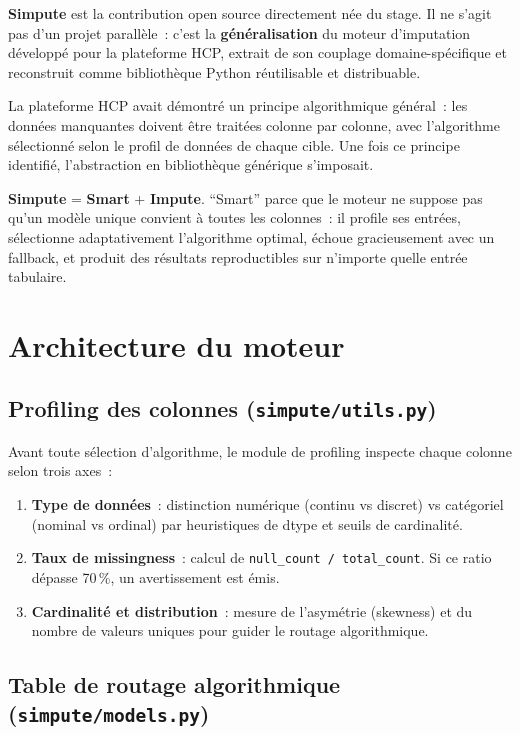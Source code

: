 \documentclass[12pt,a4paper]{report}
\begin{document}
\textbf{Simpute} est la contribution open source directement née du stage. Il ne s'agit pas d'un projet parallèle~: c'est la \textbf{généralisation} du moteur d'imputation développé pour la plateforme HCP, extrait de son couplage domaine-spécifique et reconstruit comme bibliothèque Python réutilisable et distribuable.

La plateforme HCP avait démontré un principe algorithmique général~: les données manquantes doivent être traitées colonne par colonne, avec l'algorithme sélectionné selon le profil de données de chaque cible. Une fois ce principe identifié, l'abstraction en bibliothèque générique s'imposait.

\begin{infobox}[Étymologie]
\textbf{Simpute} = \textbf{Smart} + \textbf{Impute}. ``Smart'' parce que le moteur ne suppose pas qu'un modèle unique convient à toutes les colonnes~: il profile ses entrées, sélectionne adaptativement l'algorithme optimal, échoue gracieusement avec un fallback, et produit des résultats reproductibles sur n'importe quelle entrée tabulaire.
\end{infobox}

\section{Architecture du moteur}

\subsection{Profiling des colonnes (\texttt{simpute/utils.py})}

Avant toute sélection d'algorithme, le module de profiling inspecte chaque colonne selon trois axes~:
\begin{enumerate}
  \item \textbf{Type de données}~: distinction numérique (continu vs discret) vs catégoriel (nominal vs ordinal) par heuristiques de dtype et seuils de cardinalité.
  \item \textbf{Taux de missingness}~: calcul de \texttt{null\_count / total\_count}. Si ce ratio dépasse 70\,\%, un avertissement est émis.
  \item \textbf{Cardinalité et distribution}~: mesure de l'asymétrie (skewness) et du nombre de valeurs uniques pour guider le routage algorithmique.
\end{enumerate}

\subsection{Table de routage algorithmique (\texttt{simpute/models.py})}
\end{document}
